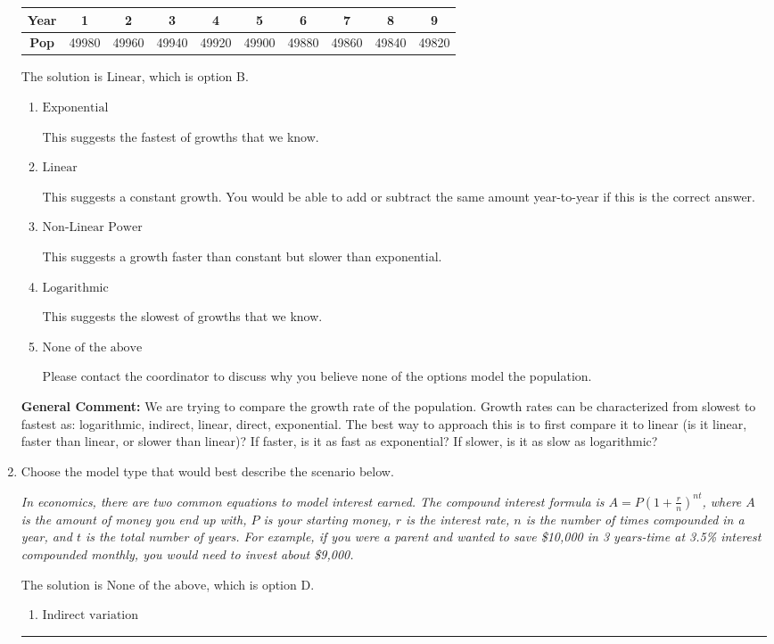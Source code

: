 \documentclass{extbook}[14pt]
\newcommand{\litem}[1]{\item #1

\rule{\textwidth}{0.4pt}}
\begin{document}
\begin{enumerate}
{\begin{tabular}{c|c|c|c|c|c|c|c|c|c}
\textbf{Year} &1 &2 &3 &4 &5 &6 &7 &8 &9\tabularnewline \hline
\textbf{Pop} &49980 &49960 &49940 &49920 &49900 &49880 &49860 &49840 &49820\end{tabular}The solution is \( \text{Linear} \), which is option B.\begin{enumerate}[label=\Alph*.]
\item \( \text{Exponential} \)

This suggests the fastest of growths that we know.
\item \( \text{Linear} \)

This suggests a constant growth. You would be able to add or subtract the same amount year-to-year if this is the correct answer.
\item \( \text{Non-Linear Power} \)

This suggests a growth faster than constant but slower than exponential.
\item \( \text{Logarithmic} \)

This suggests the slowest of growths that we know.
\item \( \text{None of the above} \)

Please contact the coordinator to discuss why you believe none of the options model the population.
\end{enumerate}

\textbf{General Comment:} We are trying to compare the growth rate of the population. Growth rates can be characterized from slowest to fastest as: logarithmic, indirect, linear, direct, exponential. The best way to approach this is to first compare it to linear (is it linear, faster than linear, or slower than linear)? If faster, is it as fast as exponential? If slower, is it as slow as logarithmic?
}
\litem{
Choose the model type that would best describe the scenario below.

\begin{center}
    \textit{ In economics, there are two common equations to model interest earned. The compound interest formula is $A = P (1 + \frac{r}{n})^{nt}$, where $A$ is the amount of money you end up with, $P$ is your starting money, $r$ is the interest rate, $n$ is the number of times compounded in a year, and $t$ is the total number of years. For example, if you were a parent and wanted to save \$10,000 in 3 years-time at 3.5\% interest compounded monthly, you would need to invest about \$9,000. }
\end{center}
The solution is \( \text{None of the above} \), which is option D.\begin{enumerate}[label=\Alph*.]
\item \( \text{Indirect variation} \)



\end{enumerate}}
\end{enumerate}
\end{document}
